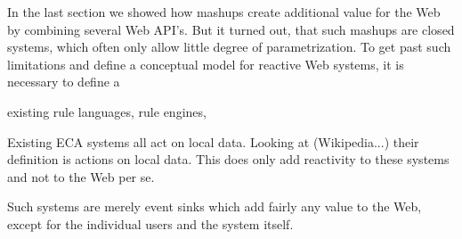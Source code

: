 


In the last section we showed how mashups create additional value for the Web by combining several Web API's.
But it turned out, that such mashups are closed systems, which often only allow little degree of parametrization.
To get past such limitations and define a conceptual model for reactive Web systems, it is necessary to define a 

existing rule languages, rule engines, 

Existing ECA systems all act on local data.
Looking at (Wikipedia...) their definition is actions on local data.
This does only add reactivity to these systems and not to the Web per se.

Such systems are merely event sinks which add fairly any value to the Web, except for the individual users and the system itself.








